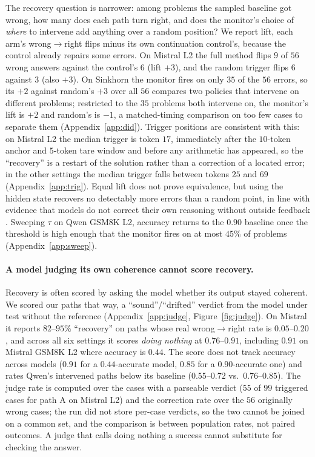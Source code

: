 \documentclass{article}
\begin{document}
The recovery question is narrower: among problems the sampled baseline got wrong, how many does each path turn right, and does the monitor's choice of \emph{where} to intervene add anything over a random position? We report lift, each arm's wrong$\to$right flips minus its own continuation control's, because the control already repairs some errors. On Mistral L2 the full method flips $9$ of $56$ wrong answers against the control's $6$ (lift $+3$), and the random trigger flips $6$ against $3$ (also $+3$). On Sinkhorn the monitor fires on only $35$ of the $56$ errors, so its $+2$ against random's $+3$ over all $56$ compares two policies that intervene on different problems; restricted to the $35$ problems both intervene on, the monitor's lift is $+2$ and random's is $-1$, a matched-timing comparison on too few cases to separate them (Appendix~\ref{app:did}). Trigger positions are consistent with this: on Mistral L2 the median trigger is token $17$, immediately after the $10$-token anchor and $5$-token tare window and before any arithmetic has appeared, so the ``recovery'' is a restart of the solution rather than a correction of a located error; in the other settings the median trigger falls between tokens $25$ and $69$ (Appendix~\ref{app:trig}). Equal lift does not prove equivalence, but using the hidden state recovers no detectably more errors than a random point, in line with evidence that models do not correct their own reasoning without outside feedback \citep{huang2024cannot}. Sweeping $\tau$ on Qwen GSM8K L2, accuracy returns to the $0.90$ baseline once the threshold is high enough that the monitor fires on at most $45\%$ of problems (Appendix~\ref{app:sweep}).

\paragraph{A model judging its own coherence cannot score recovery.}
Recovery is often scored by asking the model whether its output stayed coherent. We scored our paths that way, a ``sound''/``drifted'' verdict from the model under test without the reference (Appendix~\ref{app:judge}, Figure~\ref{fig:judge}). On Mistral it reports $82$--$95\%$ ``recovery'' on paths whose real wrong$\to$right rate is $0.05$--$0.20$, and across all six settings it scores \emph{doing nothing} at $0.76$--$0.91$, including $0.91$ on Mistral GSM8K L2 where accuracy is $0.44$. The score does not track accuracy across models ($0.91$ for a $0.44$-accurate model, $0.85$ for a $0.90$-accurate one) and rates Qwen's intervened paths below its baseline ($0.55$--$0.72$ vs.\ $0.76$--$0.85$). The judge rate is computed over the cases with a parseable verdict ($55$ of $99$ triggered cases for path A on Mistral L2) and the correction rate over the $56$ originally wrong cases; the run did not store per-case verdicts, so the two cannot be joined on a common set, and the comparison is between population rates, not paired outcomes. A judge that calls doing nothing a success cannot substitute for checking the answer.
\end{document}
